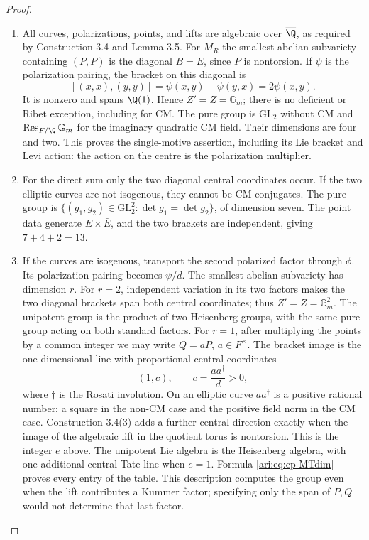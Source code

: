 \begin{proof}
\begin{enumerate}[label=\arabic*.,leftmargin=*]
\item All curves, polarizations, points, and lifts are algebraic over
$\overline\Q$, as required by Construction 3.4 and Lemma 3.5.
For $M_R$ the smallest abelian subvariety containing $(P,P)$ is
the diagonal $B=E$, since $P$ is nontorsion. If $\psi$ is the
polarization pairing, the bracket on this diagonal is
\[
 [(x,x),(y,y)]=\psi(x,y)-\psi(y,x)=2\psi(x,y).
\]
It is nonzero and spans $\Q(1)$. Hence $Z'=Z=\mathbb G_m$;
there is no deficient or Ribet exception, including for CM.
The pure group is $\mathrm{GL}_2$ without CM and
$\operatorname{Res}_{F/\Q}\mathbb G_m$ for the imaginary
quadratic CM field. Their dimensions are four and two.
This proves the single-motive assertion, including its Lie
bracket and Levi action: the action on the centre is the
polarization multiplier.

\item For the direct sum only the two diagonal central coordinates
occur. If the two elliptic curves are not isogenous, they
cannot be CM conjugates. The pure group is
$\{(g_1,g_2)\in\mathrm{GL}_2^2:\det g_1=\det g_2\}$,
of dimension seven. The point data generate $E\times\bar E$,
and the two brackets are independent, giving $7+4+2=13$.

\item If the curves are isogenous, transport the second polarized
factor through $\phi$. Its polarization pairing becomes
$\psi/d$. The smallest abelian subvariety has dimension $r$.
For $r=2$, independent variation in its two factors makes the
two diagonal brackets span both central coordinates; thus
$Z'=Z=\mathbb G_m^2$. The unipotent group is the product
of two Heisenberg groups, with the same pure group acting
on both standard factors.
For $r=1$, after multiplying the points by a common integer
we may write $Q=aP$, $a\in F^\times$. The bracket image is
the one-dimensional line with proportional central coordinates
\begin{equation}\label{ari:eq:cp-positive-centre}
 (1,c),\qquad c=\frac{a a^\dagger}{d}>0,
\end{equation}
where $\dagger$ is the Rosati involution. On an elliptic curve
$aa^\dagger$ is a positive rational number: a square in the
non-CM case and the positive field norm in the CM case.
Construction 3.4(3) adds a further central direction exactly
when the image of the algebraic lift in the quotient torus
is nontorsion. This is the integer $e$ above.
The unipotent Lie algebra is the Heisenberg algebra, with one
additional central Tate line when $e=1$. Formula
\eqref{ari:eq:cp-MTdim} proves every entry of the table. This
description computes the group even when the lift contributes
a Kummer factor; specifying only the span of $P,Q$ would
not determine that last factor.
\end{enumerate}
\end{proof}





